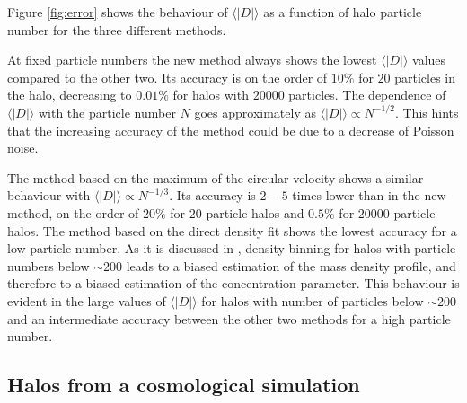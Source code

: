 \documentclass[a4,useAMS,usenatbib,usegraphicx]{mn2e}
\newcommand{\avg}[1]{\langle{#1}\rangle}
\begin{document}
Figure \ref{fig:error} shows the behaviour of $\avg{|D|}$ as a function of
halo particle number for the three different methods.

At fixed particle numbers the new method always shows the lowest
$\avg{|D|}$ values compared to the other two.
Its accuracy is on the order of $10\%$ for $20$ particles in the halo,
decreasing to $0.01\%$ for halos with $20000$ particles.  
The dependence of $\avg{|D|}$ with the particle number $N$
goes approximately as $\avg{|D|}\propto N^{-1/2}$.   
This hints that the increasing accuracy of the method could be due to
a decrease of Poisson noise. 

The method based on the maximum of the circular velocity shows a
similar behaviour with $\avg{|D|}\propto N^{-1/3}$.  
Its accuracy is $2-5$ times lower than in the new method, on the order of
$20\%$ for $20$ particle halos and $0.5\%$ for $20000$ particle
halos. 
The method  based on the direct density fit shows the lowest accuracy for a low
  particle number. 
  As it is discussed in \citep{Munoz2011}, density binning for halos
  with particle numbers below $\sim200$ leads to a biased estimation
  of the mass density profile, and therefore to a biased estimation of
  the concentration parameter. 
This behaviour is evident in the large values of $\avg{|D|}$ for halos
with number of particles below $\sim 200$ and an intermediate accuracy
between the other two methods for a high particle number. 

\subsection{Halos from a cosmological simulation}
\end{document}
